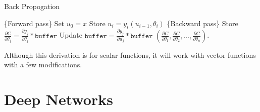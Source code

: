 \documentclass[a4paper]{tufte-handout}
\begin{document}
\begin{algorithm}[H]
\caption{Back Propogation}
\begin{algorithmic}[1]
  \STATE \{Forward pass\}
  \STATE Set \(u_0 = x\)
  	\STATE Store \(u_i = y_i(u_{i-1}, \theta_i)\)
  \ENDFOR
  \STATE \{Backward pass\}
  	\STATE Store \(\frac{\partial C}{\partial \theta_j} = \frac{\partial y_j}{\partial \theta_j} * \texttt{buffer}\)
  	\STATE Update \(\texttt{buffer} = \frac{\partial y_j}{\partial u_j} * \texttt{buffer}\)
  \ENDFOR 
  \RETURN \(\left(\frac{\partial C}{\partial\theta_1}, \frac{\partial C}{\partial\theta_2}, \ldots, \frac{\partial C}{\partial\theta_n}\right)\).
\end{algorithmic}
\end{algorithm}


Although this derivation is for scalar functions, it will work with
vector functions with a few modifications.

\section{Deep Networks}
\end{document}
